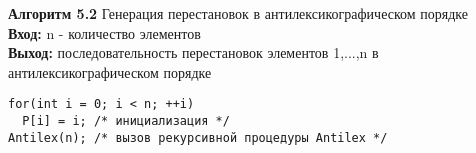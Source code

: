 \documentclass[10pt, a5paper]{article}
\begin{document}

\noindent\textbf{Алгоритм 5.2} Генерация перестановок в антилексикографическом порядке\\
\noindent\textbf{Вход:} n - количество элементов\\
\noindent\textbf{Выход:} последовательность перестановок элементов 1,...,n в\\
антилексикографическом порядке
\begin{lstlisting}
for(int i = 0; i < n; ++i)
  P[i] = i; /* инициализация */
Antilex(n); /* вызов рекурсивной процедуры Antilex */
\end{lstlisting}
\end{document}
